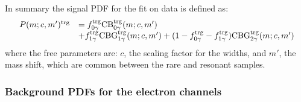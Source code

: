 In summary the signal PDF for the fit on data is defined as:
%
\begin{equation}
\begin{array} {ll}
P(m;c,m')^{\rm trg} & = f^{\rm trg}_{0\gamma} \text{CB}^{\rm trg}_{0\gamma}(m;c,m')  \\
& + f^{\rm trg}_{1\gamma} \text{CBG}^{\rm trg}_{1\gamma}(m;c,m') + (1 - f^{\rm trg}_{0\gamma} - f^{\rm trg}_{1\gamma}) \text{CBG}^{\rm trg}_{2\gamma}(m;c,m')
\end{array} 
\end{equation}
%
where the free parameters are: $c$, the scaling factor for the widths, and $m'$, the mass shift,
which are common between the rare and resonant samples.

\subsubsection{Background PDFs for the electron channels}
\label{sec:RKst_misreco_fit}

